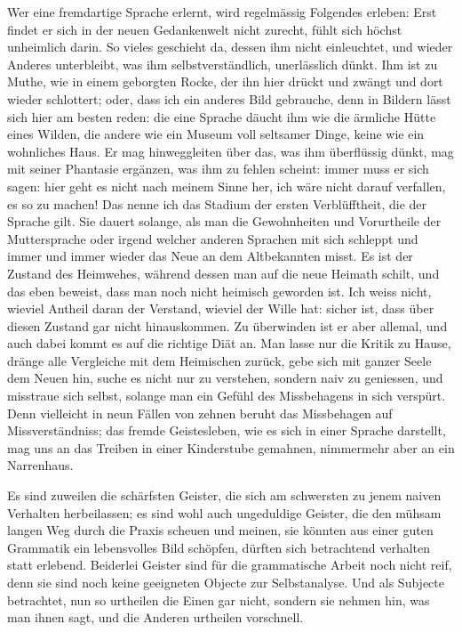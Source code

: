 Wer eine fremdartige Sprache erlernt, wird regelmässig Folgendes erleben: Erst findet er sich in der neuen Gedankenwelt nicht zurecht, fühlt sich höchst unheimlich darin. So vieles geschieht da, dessen  ihm nicht einleuchtet, und wieder Anderes unterbleibt, was ihm selbstverständlich, unerlässlich dünkt. Ihm ist zu Muthe, wie in einem geborgten Rocke, der ihn hier drückt und zwängt und dort wieder schlottert; oder, dass ich ein anderes Bild gebrauche, denn in Bildern lässt sich hier am besten reden: die eine Sprache däucht ihm wie die ärmliche Hütte eines Wilden, die andere wie ein Museum voll seltsamer Dinge, keine wie ein wohnliches Haus. Er mag hinweggleiten über das, was ihm überflüssig dünkt, mag mit seiner Phantasie ergänzen, was ihm zu fehlen scheint: immer muss er sich sagen: hier geht es nicht nach meinem Sinne her, ich wäre nicht darauf verfallen, es so zu machen! Das nenne ich das Stadium der ersten Verblüfftheit, die der Sprache \label{fp.85} gilt. Sie dauert solange, als man die Gewohnheiten und Vorurtheile der Muttersprache oder irgend welcher anderen Sprachen mit sich schleppt und immer und immer wieder das Neue an dem Altbekannten misst. Es ist der Zustand des Heimwehes, während dessen man auf die neue Heimath schilt, und das eben beweist, dass man noch nicht heimisch geworden ist. Ich weiss nicht, wieviel Antheil daran der Verstand, wieviel der Wille hat: sicher ist, dass  über diesen Zustand gar nicht hinauskommen. Zu überwinden ist er aber allemal, und auch dabei kommt es auf die richtige Diät an. Man lasse nur die Kritik zu Hause, dränge alle Vergleiche mit dem Heimischen zurück, gebe sich mit ganzer Seele dem Neuen hin, suche es nicht nur zu verstehen, sondern naiv zu geniessen, und misstraue sich selbst, solange man ein Gefühl des Missbehagens in sich verspürt. Denn vielleicht in neun Fällen von zehnen beruht das Missbehagen auf Missverständniss; das fremde Geistesleben, wie es sich in einer Sprache darstellt, mag uns an das Treiben in einer Kinderstube gemahnen, nimmermehr aber an ein Narrenhaus.

Es sind zuweilen die schärfsten Geister, die sich am schwersten zu jenem naiven Verhalten herbeilassen; es sind wohl auch ungeduldige Geister, die den mühsam langen Weg durch die Praxis scheuen und meinen, sie könnten aus einer guten Grammatik ein lebensvolles Bild schöpfen, dürften sich betrachtend verhalten statt erlebend. Beiderlei Geister sind für die grammatische Arbeit noch nicht reif, denn sie sind noch keine geeigneten Objecte zur Selbstanalyse. Und als Subjecte betrachtet, nun so urtheilen die Einen gar nicht, sondern sie nehmen hin, was man ihnen sagt, und die Anderen urtheilen vorschnell.


